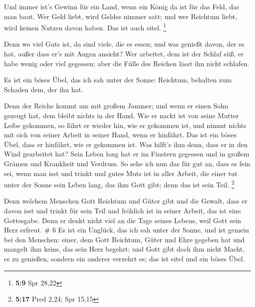  Und immer ist's Gewinn für ein Land, wenn ein König da
ist für das Feld, das man baut.  Wer Geld liebt, wird
Geldes nimmer satt; und wer Reichtum liebt, wird keinen Nutzen davon
haben. Das ist auch eitel. \footnote{\textbf{5:9} Spr 28,22}

 Denn wo viel Guts ist, da sind viele, die es essen; und
was genießt davon, der es hat, außer dass er's mit Augen ansieht?
 Wer arbeitet, dem ist der Schlaf süß, er habe wenig oder
viel gegessen; aber die Fülle des Reichen lässt ihn nicht schlafen.

 Es ist ein böses Übel, das ich sah unter der Sonne:
Reichtum, behalten zum Schaden dem, der ihn hat.

 Denn der Reiche kommt um mit großem Jammer; und wenn er
einen Sohn gezeugt hat, dem bleibt nichts in der Hand. 
Wie er nackt ist von seine Mutter Leibe gekommen, so fährt er wieder
hin, wie er gekommen ist, und nimmt nichts mit sich von seiner Arbeit in
seiner Hand, wenn er hinfährt.  Das ist ein böses Übel,
dass er hinfährt, wie er gekommen ist. Was hilft's ihm denn, dass er in
den Wind gearbeitet hat?  Sein Leben lang hat er im
Finstern gegessen und in großem Grämen und Krankheit und Verdruss.
 So sehe ich nun das für gut an, dass es fein sei, wenn
man isst und trinkt und gutes Muts ist in aller Arbeit, die einer tut
unter der Sonne sein Leben lang, das ihm Gott gibt; denn das ist sein
Teil. \footnote{\textbf{5:17} Pred 2,24; Spr 15,15}

 Denn welchem Menschen Gott Reichtum und Güter gibt und
die Gewalt, dass er davon isst und trinkt für sein Teil und fröhlich ist
in seiner Arbeit, das ist eine Gottesgabe.  Denn er denkt
nicht viel an die Tage seines Lebens, weil Gott sein Herz erfreut. \# 6
 Es ist ein Unglück, das ich sah unter der Sonne, und ist
gemein bei den Menschen:  einer, dem Gott Reichtum, Güter
und Ehre gegeben hat und mangelt ihm keins, das sein Herz begehrt; und
Gott gibt doch ihm nicht Macht, es zu genießen, sondern ein anderer
verzehrt es; das ist eitel und ein böses Übel.

